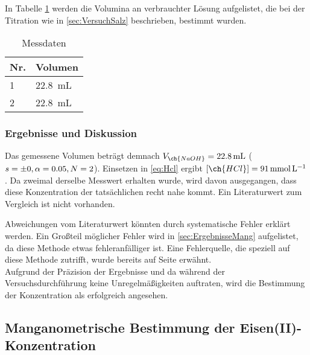 \documentclass{article}
\begin{document}
        In Tabelle \ref{tab:MessdatenSalz} werden die Volumina an verbrauchter  Lösung aufgelistet, die bei der Titration wie in \ref{sec:VersuchSalz} beschrieben, bestimmt wurden. 
        
        \begin{table}[H]
          \centering
          \caption[Messdaten der Bestimmung der Konzentration einer Salzsäure, Quelle: Autor]{Messdaten}
          \label{tab:MessdatenSalz}
            \begin{tabular}{@{}l|l@{}}
              \toprule
               Nr. & Volumen \\ \midrule
               1 & \SI[mode=text]{22.8}{\milli\liter} \\
               2 & \SI[mode=text]{22.8}{\milli\liter} \\ \bottomrule
            \end{tabular}
        \end{table} 
        
      \subsubsection{Ergebnisse und Diskussion} \label{eq:ErgebnisseHCL}
        
        Das gemessene Volumen beträgt demnach $V_{\ch{NaOH}} = \SI[mode=text]{22.8}{\milli\liter}$ ($s = \num{\pm 0}, \alpha=0.05,N=2$). Einsetzen in \eqref{eq:Hcl} ergibt $[\ch{HCl}] = \SI[mode=text]{91}{\milli\mole\per\liter}$. Da zweimal derselbe Messwert erhalten wurde, wird davon ausgegangen, dass diese Konzentration der tatsächlichen recht nahe kommt. Ein Literaturwert zum Vergleich ist nicht vorhanden. 
        
        Abweichungen vom Literaturwert könnten durch systematische Fehler erklärt werden. Ein Großteil möglicher Fehler wird in \ref{sec:ErgebnisseMang} aufgelistet, da diese Methode etwas fehleranfälliger ist. Eine Fehlerquelle, die speziell auf diese Methode zutrifft, wurde bereits auf Seite \pageref{seite} erwähnt. \\
        
        Aufgrund der Präzision der Ergebnisse und da während der Versuchsdurchführung keine Unregelmäßigkeiten auftraten, wird die Bestimmung der  Konzentration als erfolgreich angesehen. 
        
    \pagebreak
    
    \subsection{Manganometrische Bestimmung der Eisen(II)-Konzentration}
        
\end{document}
